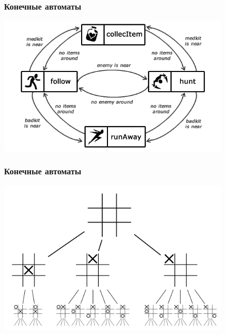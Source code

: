 \documentclass{beamer}
\begin{document}
\begin{frame}[fragile]
  \transwipe[direction=90]
  \frametitle{Конечные автоматы}
  \begin{center}
     \includegraphics[width=0.85\textwidth]{pics/game.png}
   \end{center}
\end{frame}

\begin{frame}[fragile]
  \transwipe[direction=90]
  \frametitle{Конечные автоматы}
  \begin{center}
     \includegraphics[width=0.85\textwidth]{pics/tictac.jpg}
   \end{center}
\end{frame}
\end{document}
